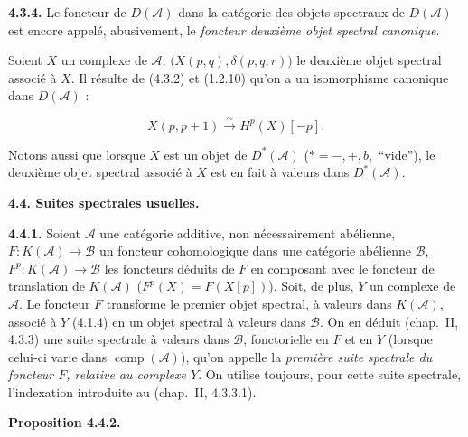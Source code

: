 \clearpage
{}%
\begingroup\small\setlength{\parskip}{0pt}\setlength{\emergencystretch}{1.5em}
\setlength{\abovedisplayskip}{4pt plus 2pt minus 2pt}%
\setlength{\belowdisplayskip}{4pt plus 2pt minus 2pt}%

\noindent\textbf{4.3.4.}\quad
Le foncteur de $D(\mathcal A)$ dans la catégorie des objets spectraux de
$D(\mathcal A)$ est encore appelé, abusivement, le \emph{foncteur deuxième
objet spectral canonique}.

Soient $X$ un complexe de $\mathcal A$,
$\bigl(X(p,q),\delta(p,q,r)\bigr)$ le deuxième objet spectral associé à
$X$. Il résulte de (4.3.2) et (1.2.10) qu'on a un isomorphisme canonique
dans $D(\mathcal A)$ :

\begin{equation}
X(p,p+1)\xrightarrow{\sim}H^p(X)[-p].
\tag{4.3.4.1}
\end{equation}

Notons aussi que lorsque $X$ est un objet de $D^*(\mathcal A)$
($*=-,+,b,$ ``vide''), le deuxième objet spectral associé à $X$ est en
fait à valeurs dans $D^*(\mathcal A)$.

\medskip\noindent\textbf{4.4. Suites spectrales usuelles.}

\medskip\noindent\textbf{4.4.1.}\quad
Soient $\mathcal A$ une catégorie additive, non nécessairement abélienne,
$F\colon K(\mathcal A)\longrightarrow\mathcal B$ un foncteur cohomologique
dans une catégorie abélienne $\mathcal B$,
$F^p\colon K(\mathcal A)\longrightarrow\mathcal B$ les foncteurs déduits
de $F$ en composant avec le foncteur de translation de $K(\mathcal A)$
($F^p(X)=F(X[p])$). Soit, de plus, $Y$ un complexe de $\mathcal A$. Le
foncteur $F$ transforme le premier objet spectral, à valeurs dans
$K(\mathcal A)$, associé à $Y$ (4.1.4) en un objet spectral à valeurs dans
$\mathcal B$. On en déduit (chap.~II, 4.3.3) une suite spectrale à valeurs
dans $\mathcal B$, fonctorielle en $F$ et en $Y$ (lorsque celui-ci varie
dans $\operatorname{comp}(\mathcal A)$), qu'on appelle la \emph{première
suite spectrale du foncteur $F$, relative au complexe $Y$}. On utilise
toujours, pour cette suite spectrale, l'indexation introduite au
(chap.~II, 4.3.3.1).

\medskip\noindent\textbf{Proposition 4.4.2.}\quad

